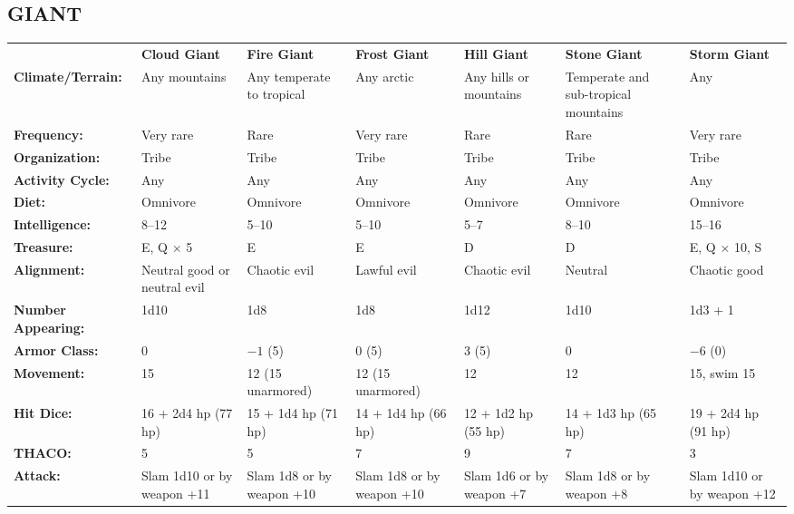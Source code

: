 \noindent \begin{minipage}{\columnwidth}

\vspace{1em}

\subsection{GIANT}

\noindent \begin{tabular}{p{}g{.11\columnwidth}p{.108\columnwidth}g{.11\columnwidth}p{.108\columnwidth}g{.11\columnwidth}p{.11\columnwidth}}
	& \textbf{Cloud Giant}	& \textbf{Fire Giant}	& \textbf{Frost Giant}	& \textbf{Hill Giant}	& \textbf{Stone Giant}	& \textbf{Storm Giant}	\\
\textbf{Climate/Terrain:}	& Any mountains	& Any temperate to tropical	& Any arctic	& Any hills or mountains	& Temperate and sub-tropical mountains	& Any	\\
\textbf{Frequency:} 		& Very rare	& Rare	& Very rare	& Rare	& Rare	& Very rare	\\
\textbf{Organization:} 		& Tribe	& Tribe	& Tribe	& Tribe	& Tribe	& Tribe	\\
\textbf{Activity Cycle:} 	& Any	& Any	& Any	& Any	& Any	& Any	\\
\textbf{Diet:} 				& Omnivore	& Omnivore	& Omnivore	& Omnivore	& Omnivore	& Omnivore	\\
\textbf{Intelligence:} 		& 8--12	& 5--10	& 5--10	& 5--7	& 8--10	& 15--16	\\
\textbf{Treasure:} 			& E, Q $\times$ 5	& E	& E	& D	& D	& E, Q $\times$ 10, S	\\
\textbf{Alignment:} 		& Neutral good or neutral evil	& Chaotic evil	& Lawful evil	& Chaotic evil	& Neutral	& Chaotic good	\\
\hline
\textbf{Number Appearing:} 	& 1d10	& 1d8	& 1d8	& 1d12	& 1d10	& 1d3 + 1	\\
\textbf{Armor Class:} 		& 0	& $-1$ (5)	& 0 (5)	& 3 (5)	& 0	& $-6$ (0)	\\
\textbf{Movement:} 			& 15	& 12 (15 unarmored)	& 12 (15 unarmored)	& 12	& 12	& 15, swim 15	\\
\textbf{Hit Dice:} 			& 16 + 2d4 hp (77 hp)	& 15 + 1d4 hp (71 hp)	& 14 + 1d4 hp (66 hp)	& 12 + 1d2 hp (55 hp)	& 14 + 1d3 hp (65 hp)	& 19 + 2d4 hp (91 hp)	\\
\textbf{THACO:} 			& 5	& 5	& 7	& 9	& 7	& 3	\\
\textbf{Attack:} 			& Slam 1d10 or by weapon +11	& Slam 1d8 or by weapon	+10 & Slam 1d8 or by weapon +10	& Slam 1d6 or by weapon +7	& Slam 1d8 or by weapon +8	& Slam 1d10 or by weapon +12	\\

\end{tabular}
\end{minipage}
